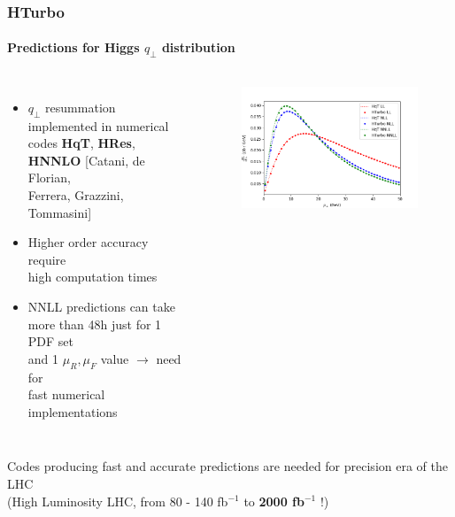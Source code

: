 \documentclass[aspectratio=43]{beamer}
\begin{document}
\begin{frame}

	\frametitle{HTurbo}
	\framesubtitle{Predictions for Higgs $q_{\perp}$ distribution}
	
	\footnotesize
	
	\begin{columns}
		
			
		\begin{itemize}
			\item $q_{\perp}$ resummation implemented in numerical codes \textbf{HqT}, \textbf{HRes}, \textbf{HNNLO} {\color{blue}[Catani, de Florian, \\ Ferrera, Grazzini, Tommasini]} 
			\item Higher order accuracy require \\
			{\color{red}high computation times}
			\item NNLL predictions can take \\ more than 48h {\color{red} just for 1 PDF set \\
			and 1 $\mu_{R}, \mu_{F}$ value} $\longrightarrow$ need for \\ {\color{red} fast numerical implementations}
		\end{itemize}

	
		\begin{figure}
			\includegraphics[width = 6 cm]{plots/part3/chapter6/higgs_qt_all.png}
		\end{figure}		
			
	\end{columns}

	\vspace{0.5 cm}
	
	Codes producing fast and accurate predictions are needed for precision era of the LHC \\
	(High Luminosity LHC, from 80 - 140 fb$^{-1}$ to \textbf{2000 fb$^{-1}$} !)
	
\end{frame}
\end{document}
